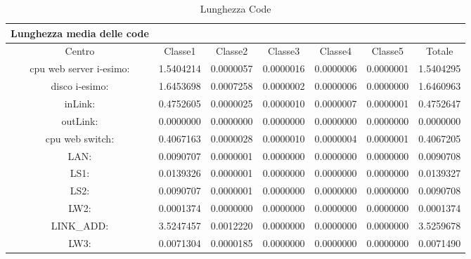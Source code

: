 \begin{table}[htbp]
\begin{center}
\begin{tabular}{||c|c|c|c|c|c|c||}
\hline
Lunghezza media delle code\\
\hline
Centro &Classe1 &Classe2 &Classe3 &Classe4 &Classe5 &Totale\\
\hline
\hline
 cpu web server i-esimo: 	&1.5404214	&0.0000057	&0.0000016	&0.0000006	&0.0000001	&1.5404295\\
\hline
 disco i-esimo: 	&1.6453698	&0.0007258	&0.0000002	&0.0000006	&0.0000000	&1.6460963\\
\hline
 inLink: 	&0.4752605	&0.0000025	&0.0000010	&0.0000007	&0.0000001	&0.4752647\\
\hline
 outLink: 	&0.0000000	&0.0000000	&0.0000000	&0.0000000	&0.0000000	&0.0000000\\
\hline
 cpu web switch: 	&0.4067163	&0.0000028	&0.0000010	&0.0000004	&0.0000001	&0.4067205\\
\hline
 LAN: 	&0.0090707	&0.0000001	&0.0000000	&0.0000000	&0.0000000	&0.0090708\\
\hline
 LS1: 	&0.0139326	&0.0000001	&0.0000000	&0.0000000	&0.0000000	&0.0139327\\
\hline
 LS2: 	&0.0090707	&0.0000001	&0.0000000	&0.0000000	&0.0000000	&0.0090708\\
\hline
 LW2: 	&0.0001374	&0.0000000	&0.0000000	&0.0000000	&0.0000000	&0.0001374\\
\hline
 LINK_ADD: 	&3.5247457	&0.0012220	&0.0000000	&0.0000000	&0.0000000	&3.5259678\\
\hline
 LW3: 	&0.0071304	&0.0000185	&0.0000000	&0.0000000	&0.0000000	&0.0071490\\
\hline
\end{tabular}
\end{center}
\caption{Lunghezza Code}
\label{lunghezzacode}
\end{table}

